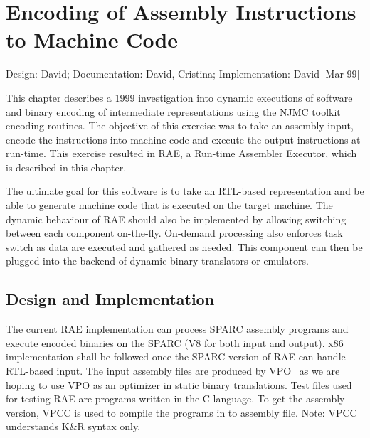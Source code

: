 
\chapter{Encoding of Assembly Instructions to Machine Code}
\label{ch-njmcencoding}

{\small
\begin{flushright}
Design: David; Documentation: David, Cristina; Implementation: David [Mar 99]
\end{flushright} 
}

This chapter describes a 1999 investigation into dynamic executions of
software and binary encoding of intermediate representations using the NJMC
toolkit encoding routines.  The objective of this exercise was to take an
assembly input, encode the instructions into machine code and execute the
output instructions at run-time.  This exercise resulted in RAE, a
Run-time Assembler Executor, which is described in this chapter. 

The ultimate goal for this software is to take an RTL-based 
representation and be able to generate machine code that is executed
on the target machine.
The dynamic behaviour of RAE should also be implemented by allowing 
switching between each component on-the-fly.  On-demand processing also 
enforces task switch as data are executed and gathered as needed.
This component can then be plugged into the backend of dynamic
binary translators or emulators.


\section{Design and Implementation}

The current RAE implementation can process SPARC assembly programs and execute
encoded binaries on the SPARC (V8 for both input and output).  x86
implementation shall be followed once the SPARC version of RAE can handle
RTL-based input.  The input assembly files are produced by
VPO~\cite{Beni88} as we are hoping to use VPO as an optimizer in static
binary translations.  Test files used for testing RAE are programs written
in the C language.  To get the assembly version, VPCC is used to compile
the programs in to assembly file.  Note: VPCC understands K\&R syntax
only. 


